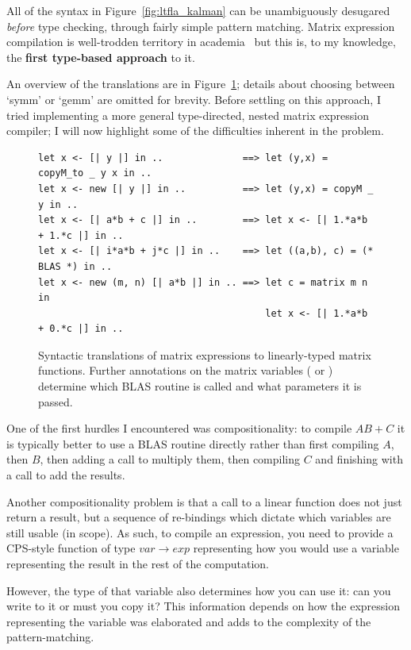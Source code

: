 All of the syntax in Figure~\ref{fig:ltfla_kalman} can be unambiguously
desugared \emph{before} type checking, through fairly simple pattern matching.
Matrix expression compilation is well-trodden territory in
academia~\cite{rocklin_thesis, fabregat_thesis, gunnels_flame, linnea, taco}
but this is, to my knowledge, the \textbf{first type-based approach} to it.

An overview of the translations are in Figure~\ref{fig:mat_patterns}; details
about choosing between `symm' or `gemm' are omitted for brevity. Before
settling on this approach, I tried implementing a more general type-directed,
nested matrix expression compiler; I will now highlight some of the
difficulties inherent in the problem.

\begin{figure}[tp]
    \begin{verbatim}
let x <- [| y |] in ..              ==> let (y,x) = copyM_to _ y x in ..
let x <- new [| y |] in ..          ==> let (y,x) = copyM _ y in ..
let x <- [| a*b + c |] in ..        ==> let x <- [| 1.*a*b + 1.*c |] in ..
let x <- [| i*a*b + j*c |] in ..    ==> let ((a,b), c) = (* BLAS *) in ..
let x <- new (m, n) [| a*b |] in .. ==> let c = matrix m n in
                                        let x <- [| 1.*a*b + 0.*c |] in ..
    \end{verbatim}
    \caption{Syntactic translations of matrix expressions to linearly-typed
        matrix functions. Further annotations on the matrix variables
        ( or ) determine which BLAS routine is called and
        what parameters it is passed.}\label{fig:mat_patterns}

\end{figure}

One of the first hurdles I encountered was compositionality: to compile $AB +
C$ it is typically better to use a BLAS routine directly rather than first
compiling $A$, then $B$, then adding a call to multiply them, then compiling
$C$ and finishing with a call to add the results.

Another compositionality problem is that a call to a linear function does not
just return a result, but a sequence of re-bindings which dictate which
variables are still usable (in scope).  As such, to compile an expression, you
need to provide a CPS-style function of type $var \rightarrow exp$ representing
how you would use a variable representing the result in the rest of the
computation.

However, the type of that variable also determines how you can use it: can you
write to it or must you copy it? This information depends on how the expression
representing the variable was elaborated and adds to the complexity of the
pattern-matching.

